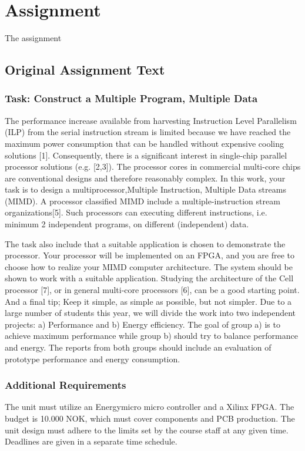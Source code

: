 \section{Assignment}
The assignment

\subsection{Original Assignment Text}

\subsubsection{Task: Construct a Multiple Program, Multiple Data}
The performance increase available from harvesting Instruction Level Parallelism (ILP) from the serial 
instruction stream is limited because we have reached the maximum power consumption that can be 
handled without expensive cooling solutions [1]. Consequently, there is a significant interest in 
single-chip parallel processor solutions (e.g. [2,3]). The processor cores in commercial multi-core 
chips are conventional designs and therefore reasonably complex. In this work, your task is to design 
a multiprocessor,Multiple Instruction, Multiple Data streams (MIMD). A processor classified MIMD 
include a multiple-instruction stream organizations[5]. Such processors can executing different 
instructions, i.e. minimum 2 independent programs, on different (independent) data. 
 
The task also include that a suitable application is chosen to demonstrate the processor. 
Your processor will be implemented on an FPGA, and you are free to choose how to realize your  
MIMD  computer  architecture.  The system should  be shown to work with  a suitable  application. 
Studying the architecture of the Cell processor [7], or in general multi-core processors [6], can be a 
good starting point. And a final tip; Keep it simple, as simple as possible, but not simpler. 
Due to a large number of students this year, we will divide the work into two independent projects: 
a) Performance and b) Energy efficiency. The goal of group a) is to achieve maximum performance 
while group b) should try to balance performance and energy. The reports from both groups should 
include an evaluation of prototype performance and energy consumption. 

\subsubsection{Additional Requirements}
The unit must utilize an Energymicro micro controller and a Xilinx FPGA. The budget is 10.000 NOK, 
which must cover components and PCB production. The unit design must adhere to the limits set by 
the course staff at any given time. Deadlines are given in a separate time schedule.

